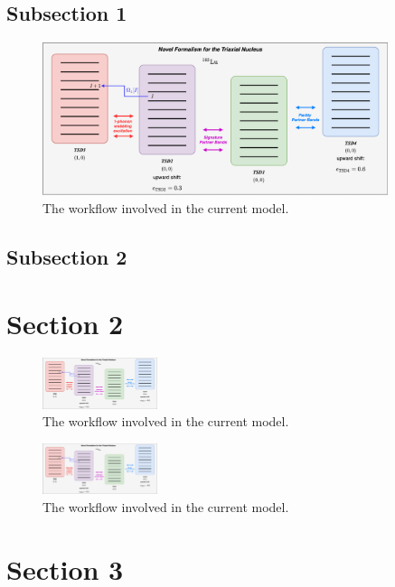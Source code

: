 \documentclass[%
preprint,
 amsmath,
 amssymb,
 aps,
]{revtex4-2}
\begin{document}
\subsection{Subsection 1}

\lipsum[1-2]

\begin{figure}
    \centering
    \includegraphics[width=0.9\textwidth]{images/diagrams/double_shift_fit_workflow.png}
    \caption{The workflow involved in the current model.}
    \label{fig:parity-workflow}
\end{figure}

\lipsum[1-3]

\subsection{Subsection 2}

\lipsum[1-3]

\section{Section 2}

\lipsum[1-3]

\lipsum[1-3]

\begin{figure}
    \centering
    \includegraphics[width=0.3\textwidth]{images/diagrams/double_shift_fit_workflow.png}
    \caption{The workflow involved in the current model.}
    \label{fig:col-fig1}
\end{figure}

\lipsum[1-3]


\begin{figure}
    \centering
    \includegraphics[width=0.3\textwidth]{images/diagrams/double_shift_fit_workflow.png}
    \caption{The workflow involved in the current model.}
    \label{fig:col-fig2}
\end{figure}

\section{Section 3}

\lipsum[1-5]

\end{document}
